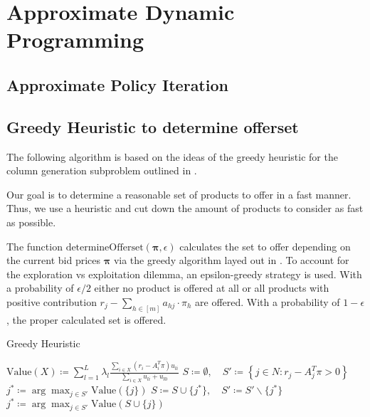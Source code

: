 \section{Approximate Dynamic Programming}

\subsection{Approximate Policy Iteration}


\subsection{Greedy Heuristic to determine offerset}\label{sec-determineOfferset}

The following algorithm is based on the ideas of the greedy heuristic for the column generation subproblem outlined in \cite{Bront.2009}.

Our goal is to determine a reasonable set of products to offer in a fast manner. Thus, we use a heuristic and cut down the amount of products to consider as fast as possible.

The function $\text{determineOfferset}(\mathbf{\pi}, \epsilon)$ calculates the set to offer depending on the current bid prices $\mathbf{\pi}$ via the greedy algorithm layed out in \cite{Bront.2009}. To account for the exploration vs exploitation dilemma, an epsilon-greedy strategy is used. With a probability of $\epsilon/2$ either no product is offered at all or all products with positive contribution $r_j - \sum_{h \in [m]} a_{hj} \cdot \pi_h$ are offered. With a probability of $1-\epsilon$, the proper calculated set is offered.


\begin{algorithm}
	\caption{Greedy Heuristic}\label{alg-GreedyHeuristic}
	\begin{algorithmic}[1] %
		\State $\text{Value}(X) \coloneqq \sum_{l=1}^{L} \lambda_l \frac{\sum_{i \in X}(r_i - A_i^T\pi)u_{li}}{\sum_{i \in X}u_{li} + u_{l0}}$
		\State $S\coloneqq \emptyset,\quad S' \coloneqq \left\{j \in N : r_j - A_j^T\pi > 0\right\}$ \label{alg-L1}
		\State $j^* \coloneqq \arg\max_{j \in S'} \text{Value}(\{j\})$
		\Repeat
		\State $S \coloneqq S \cup \{j^*\},\quad S' \coloneqq S'\backslash\{j^*\}$
		\State $j^* \coloneqq \arg \max_{j \in S'} \text{Value}(S \cup \{j\})$
	\end{algorithmic}
\end{algorithm}

